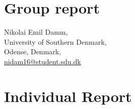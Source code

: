 
\section{Group report}














\newpage

\begin{center}
    {\Large Nikolai Emil Damm,}\\
    University of Southern Denmark,\\
    Odense, Denmark,\\
    \href{mailto:nidam16@student.sdu.dk}{nidam16@student.sdu.dk}
\end{center}

\section{Individual Report}













